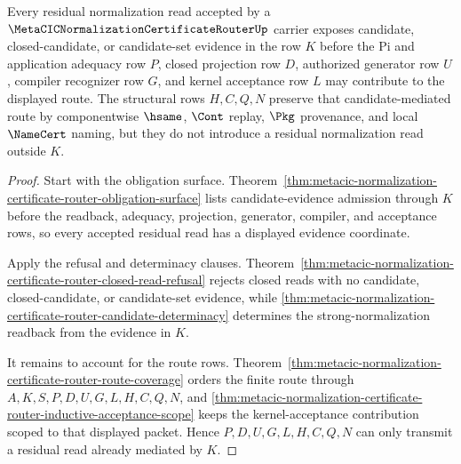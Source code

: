 \begin{theorem}
\label{thm:metacic-normalization-certificate-router-residual-candidate-coverage}
Every residual normalization read accepted by a $\MetaCICNormalizationCertificateRouterUp$ carrier exposes candidate, closed-candidate, or candidate-set evidence in the row $K$ before the Pi and application adequacy row $P$, closed projection row $D$, authorized generator row $U$, compiler recognizer row $G$, and kernel acceptance row $L$ may contribute to the displayed route. The structural rows $H,C,Q,N$ preserve that candidate-mediated route by componentwise $\hsame$, $\Cont$ replay, $\Pkg$ provenance, and local $\NameCert$ naming, but they do not introduce a residual normalization read outside $K$.
\end{theorem}
\begin{proof}
Start with the obligation surface. Theorem~\ref{thm:metacic-normalization-certificate-router-obligation-surface} lists candidate-evidence admission through $K$ before the readback, adequacy, projection, generator, compiler, and acceptance rows, so every accepted residual read has a displayed evidence coordinate.

Apply the refusal and determinacy clauses. Theorem~\ref{thm:metacic-normalization-certificate-router-closed-read-refusal} rejects closed reads with no candidate, closed-candidate, or candidate-set evidence, while \autoref{thm:metacic-normalization-certificate-router-candidate-determinacy} determines the strong-normalization readback from the evidence in $K$.

It remains to account for the route rows. Theorem~\ref{thm:metacic-normalization-certificate-router-route-coverage} orders the finite route through $A,K,S,P,D,U,G,L,H,C,Q,N$, and \autoref{thm:metacic-normalization-certificate-router-inductive-acceptance-scope} keeps the kernel-acceptance contribution scoped to that displayed packet. Hence $P,D,U,G,L,H,C,Q,N$ can only transmit a residual read already mediated by $K$.
\end{proof}

